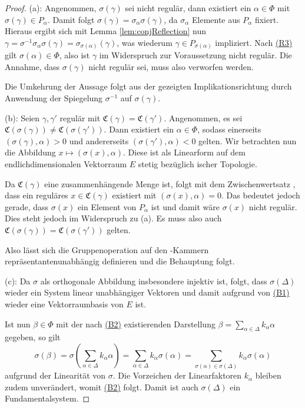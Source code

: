 \begin{proof}
  (a): 
  Angenommen, $\sigma(\gamma)$ sei nicht regulär, dann existiert ein $\alpha \in \Phi$ mit $\sigma(\gamma) \in P_\alpha$.
  Damit folgt $\sigma(\gamma) = \sigma_\alpha \sigma(\gamma)$, da $\sigma_\alpha$ Elemente aus $P_\alpha$ fixiert.
  Hieraus ergibt sich mit Lemma \ref{lem:conjReflection} nun $\gamma = \sigma^{-1} \sigma_\alpha \sigma(\gamma) = \sigma_{\sigma(\alpha)}(\gamma)$, was wiederum $\gamma \in P_{\sigma(\alpha)}$ impliziert.
  Nach \hyperref[it:R3]{(R3)} gilt $\sigma(\alpha) \in \Phi$, also ist $\gamma$ im Widerspruch zur Voraussetzung nicht regulär.
  Die Annahme, dass $\sigma(\gamma)$ nicht regulär sei, muss also verworfen werden.
  
  Die Umkehrung der Aussage folgt aus der gezeigten Implikationsrichtung durch Anwendung der Spiegelung $\sigma^{-1}$ auf $\sigma(\gamma)$.

  (b): 
  Seien $\gamma, \gamma'$ regulär mit $\mathfrak{C}(\gamma) = \mathfrak{C}(\gamma')$.
  Angenommen, es sei $\mathfrak{C}(\sigma(\gamma)) \neq \mathfrak{C}(\sigma(\gamma'))$.
  Dann existiert ein $\alpha \in \Phi$, sodass einerseits $(\sigma(\gamma), \alpha) > 0$ und andererseits $(\sigma(\gamma'), \alpha) < 0$ gelten.
  Wir betrachten nun die Abbildung $x \mapsto  (\sigma(x), \alpha)$.
  Diese ist als Linearform auf dem endlichdimensionalen Vektorraum $E$ stetig bezüglich \euklid ischer Topologie.

  Da $\mathfrak{C}(\gamma)$ eine zusammenhängende Menge ist, folgt mit dem Zwischenwertsatz \cite[S.232]{bartsch2015allgemeine}, dass ein reguläres $x \in \mathfrak{C}(\gamma)$ existiert mit $(\sigma(x), \alpha) = 0$.
  Das bedeutet jedoch gerade, dass $\sigma(x)$ ein Element von $P_\alpha$ ist und damit wäre $\sigma(x)$ nicht regulär.
  Dies steht jedoch im Widerspruch zu (a). 
  Es muss also auch $\mathfrak{C}(\sigma(\gamma)) = \mathfrak{C}(\sigma(\gamma'))$ gelten.

  Also lässt sich die Gruppenoperation auf den \weyl\hyp{}Kammern repräsentantenunabhängig definieren und die Behauptung folgt.
  
  (c): 
  Da $\sigma$ als orthogonale Abbildung insbesondere injektiv ist, folgt, dass $\sigma(\Delta)$ wieder ein System linear unabhängiger Vektoren und damit aufgrund von \hyperref[it:B1]{(B1)} wieder eine Vektorraumbasis von $E$ ist.
  
  Ist nun $\beta \in \Phi$ mit der nach \hyperref[it:B2]{(B2)} existierenden Darstellung $\beta = \sum_{\alpha \in \Delta} k_\alpha \alpha$ gegeben, so gilt
  \begin{displaymath}
  \sigma(\beta) 
    = \sigma(\sum_{\alpha \in \Delta} k_\alpha \alpha)
    = \sum_{\alpha \in \Delta} k_\alpha \sigma(\alpha)
    = \sum_{\sigma(\alpha) \in \sigma(\Delta)} k_\alpha \sigma(\alpha)
  \end{displaymath}
  aufgrund der Linearität von $\sigma$.
  Die Vorzeichen der Linearfaktoren $k_\alpha$ bleiben zudem unverändert, womit \hyperref[it:B2]{(B2)} folgt.
  Damit ist auch $\sigma(\Delta)$ ein Fundamentalsystem.


\end{proof}
